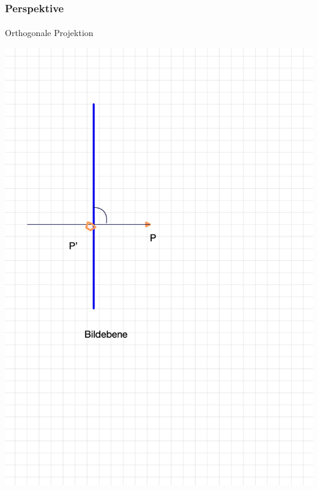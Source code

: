 \documentclass{beamer}
\begin{document}
\begin{frame}
    \frametitle{Perspektive}
\framesubtitle{}
    \begin{block}{Orthogonale Projektion}
\begin{center}
\includegraphics[scale=0.15]{images/oproj}
\end{center}
\end{block}

\end{frame}
\end{document}
